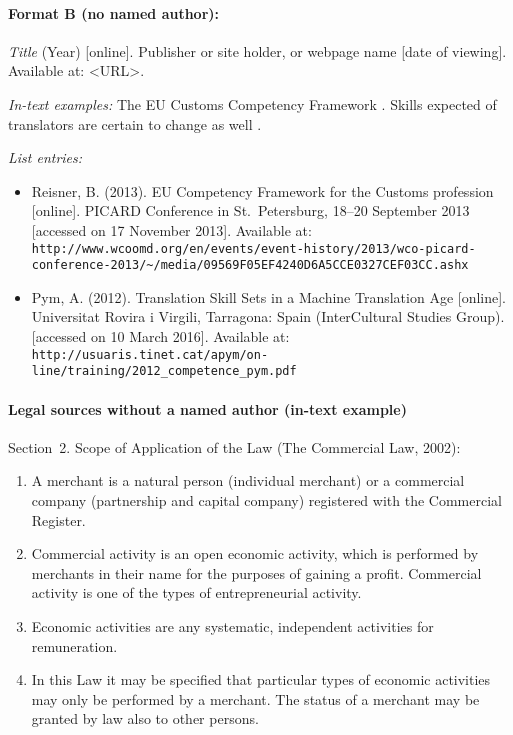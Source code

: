 \paragraph{Format B (no named author):} \emph{Title} (Year) [online]. Publisher or site holder, or webpage name [date of viewing]. Available at: \textless URL\textgreater.

\emph{In-text examples:} The EU Customs Competency Framework \parencite{reisner2013}. Skills expected of translators are certain to change as well \parencite[1]{pym2012}.

\emph{List entries:}
\begin{itemize}
  \item Reisner, B. (2013). EU Competency Framework for the Customs profession [online]. PICARD Conference in St.~Petersburg, 18--20 September 2013 [accessed on 17 November 2013]. Available at: \verb|http://www.wcoomd.org/en/events/event-history/2013/wco-picard-conference-2013/~/media/09569F05EF4240D6A5CCE0327CEF03CC.ashx|
  \item Pym, A. (2012). Translation Skill Sets in a Machine Translation Age [online]. Universitat Rovira i Virgili, Tarragona: Spain (InterCultural Studies Group). [accessed on 10 March 2016]. Available at: \verb|http://usuaris.tinet.cat/apym/on-line/training/2012_competence_pym.pdf|
\end{itemize}

\paragraph{Legal sources without a named author (in-text example)} Section~2. Scope of Application of the Law (The Commercial Law, 2002):
\begin{enumerate}
  \item A merchant is a natural person (individual merchant) or a commercial company (partnership and capital company) registered with the Commercial Register.
  \item Commercial activity is an open economic activity, which is performed by merchants in their name for the purposes of gaining a profit. Commercial activity is one of the types of entrepreneurial activity.
  \item Economic activities are any systematic, independent activities for remuneration.
  \item In this Law it may be specified that particular types of economic activities may only be performed by a merchant. The status of a merchant may be granted by law also to other persons.
\end{enumerate}

